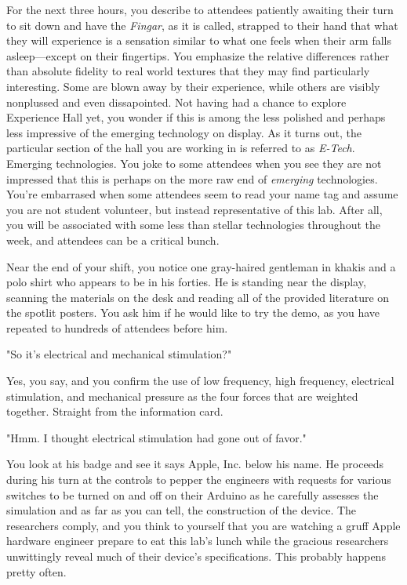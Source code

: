 \documentclass[../main.tex]{subfiles}
\begin{document}
For the next three hours, you describe to attendees patiently awaiting their turn to sit down and have the \textit{Fingar}, as it is called, strapped to their hand that what they will experience is a sensation similar to what one feels when their arm falls asleep---except on their fingertips. You emphasize the relative differences rather than absolute fidelity to real world textures that they may find particularly interesting. Some are blown away by their experience, while others are visibly nonplussed and even dissapointed. Not having had a chance to explore Experience Hall yet, you wonder if this is among the less polished and perhaps less impressive of the emerging technology on display. As it turns out, the particular section of the hall you are working in is referred to as \textit{E-Tech}. Emerging technologies. You joke to some attendees when you see they are not impressed that this is perhaps on the more raw end of \textit{emerging} technologies. You're embarrased when some attendees seem to read your name tag and assume you are not student volunteer, but instead representative of this lab. After all, you will be associated with some less than stellar technologies throughout the week, and attendees can be a critical bunch.

Near the end of your shift, you notice one gray-haired gentleman in khakis and a polo shirt who appears to be in his forties. He is standing near the display, scanning the materials on the desk and reading all of the provided literature on the spotlit posters. You ask him if he would like to try the demo, as you have repeated to hundreds of attendees before him.

"So it's electrical and mechanical stimulation?"

Yes, you say, and you confirm the use of low frequency, high frequency, electrical stimulation, and mechanical pressure as the four forces that are weighted together. Straight from the information card.

"Hmm. I thought electrical stimulation had gone out of favor."

You look at his badge and see it says Apple, Inc. below his name. He proceeds during his turn at the controls to pepper the engineers with requests for various switches to be turned on and off on their Arduino as he carefully assesses the simulation and as far as you can tell, the construction of the device.  The researchers comply, and you think to yourself that you are watching a gruff Apple hardware engineer prepare to eat this lab's lunch while the gracious researchers unwittingly reveal much of their device's specifications. This probably happens pretty often.
\end{document}
